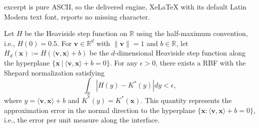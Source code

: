 \documentclass[10pt,a4paper]{amsart}
\newcommand{\bv}{\mathbf{v}}
\newcommand{\bx}{\mathbf{x}}
\begin{document}
excerpt is pure ASCII, so the delivered engine, XeLaTeX with its default Latin Modern text font, reports no missing character.
\begin{theorem}
    Let $H$ be the Heaviside step function on $\mathbb{R}$ using the half-maximum convention, i.e., $H(0) = 0.5$.
    For $\bv \in \mathbb{R}^d$ with $\|\bv\|=1$ and $b \in \mathbb{R}$, 
    let $H_d(\bx):= H(\langle \bv,\bx \rangle + b)$ be the $d$-dimensional Heaviside step function along the hyperplane $\{\bx \ | \ \langle \bv,\bx\rangle + b=0\}$.
    For any $\epsilon>0$, there exists a RBF with the Shepard normalization satisfying
    $$
    \int_{\mathbb R}|H(y)-K^*(y)|dy<\epsilon,
    $$
    where $y=\langle\bv,\bx\rangle+b$ and
$K^*(y)=K^*(\bx)$. This quantity represents the approximation error in the normal direction to the hyperplane $\{\bx:\langle\bv,\bx\rangle+b=0\}$, i.e., the error per unit measure along the interface.

    

\end{theorem}
\end{document}
